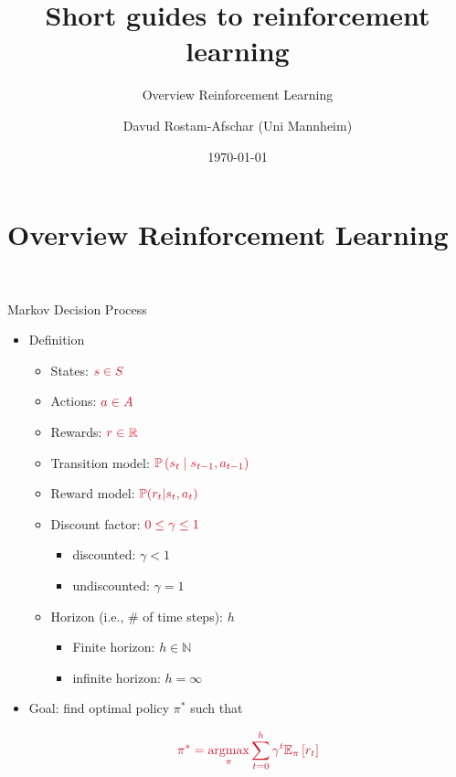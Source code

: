 \documentclass[11pt,table]{beamer}
\title[]{Short guides to reinforcement learning}
\subtitle[]{Overview Reinforcement Learning}
\author[D. Rostam-Afschar]{\textcolor{gray1}{Davud Rostam-Afschar (Uni Mannheim)}}
\date[]{\today}
\begin{document}
\begin{frame}[plain]
  \titlepage
\end{frame}


\section{Overview Reinforcement Learning}
{
\begin{frame}
\centering
\Huge
\textcolor{white}{How computers (humans) learn?}
\thispagestyle{empty}
\end{frame}
}


\begin{frame}{Markov Decision Process}
    \begin{itemize}
        \item Definition
        \begin{itemize}
\item States: $\textcolor{red1}{s \in S}$
\item  Actions: $\textcolor{red1}{a \in A}$
\item  Rewards: $\textcolor{red1}{r \in \mathbb{R}}$
\item  Transition model: $\textcolor{red1}{\mathbb{P}\left(s_{t} \mid s_{t-1}, a_{t-1}\right)}$ 
\item Reward model: $\textcolor{red1}{\mathbb{P}(r_t|s_t,a_t)}$
\item  Discount factor: $\textcolor{red1}{0 \leq \gamma \leq 1}$
\begin{itemize}
	\item discounted: $\gamma<1$
  \item undiscounted: $\gamma=1$
\end{itemize}
\item  Horizon (i.e., \# of time steps): $h$
\begin{itemize}
	\item  Finite horizon: $h \in \mathbb{N}$
  \item  infinite horizon: $h=\infty$
\end{itemize}
\end{itemize}
\item Goal: \textcolor{red1}{find optimal policy $\pi^{*}$} such that

$$
\textcolor{red1}{\pi^{*}=\underset{\pi}{\operatorname{argmax}} \sum_{t=0}^{h} \gamma^{t} \mathbb{E}_{\pi}\left[r_{t}\right]}
$$ 
    \end{itemize}
\end{frame}
\end{document}
